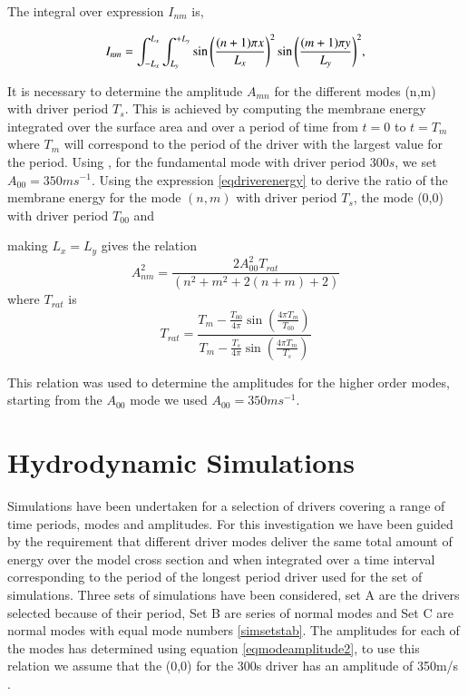 \documentclass[final,1p]{elsarticle}
\begin{document}
The integral over expression $I_{nm}$ is,

\begin{equation}\label{eqdriverenergyintegral}
I_{nm}=  \int_{-L_{x}}^{L_{x}} \int_{L_{y}}^{+L_{y}} \sin{\left(  {(n+1)\pi x}\over{L_x} \right)}^{2}   \sin{\left(  {(m+1)\pi y}\over{L_y} \right)}^{2}   ,
\end{equation}

It is necessary to determine the amplitude $A_{mn}$ for the different modes (n,m) with driver period $T_{s}$. This is achieved by computing the membrane energy integrated over the surface area and over a period of time from $t=0$ to $t=T_{m}$ where $T_m$ will correspond to the period of the driver with the largest value for the period.
Using   \cite{Leighton1960} , for the fundamental mode with driver period $300s$, we set $A_{00}=350ms^{-1}$. 
Using the expression \eqref{eqdriverenergy} to derive the ratio of the membrane energy for the mode $(n,m)$ with driver period $T_{s}$, the mode (0,0) with driver period $T_{00}$ and %

making $L_x=L_y$ gives the relation
\begin{equation}\label{eqmodeamplitude2}
A_{nm}^{2}=\frac{2A_{00}^{2}T_{rat}}{(n^2+m^2+2(n+m)+2)}
\end{equation}
where $T_{rat}$ is
\begin{equation}\label{eqtrat}
T_{rat}=
\frac{T_m-\frac{T_{00}}{4\pi}   \sin(\frac{4\pi T_m}{T_{00}})    }{T_m-\frac{T_{s}}{4\pi}   \sin(\frac{4\pi T_m}{T_{s}})  }
\end{equation}

This relation was used to determine the amplitudes for the higher order modes, starting from the $A_{00}$ mode we used  $A_{00}=350ms^{-1}$.



\section{Hydrodynamic Simulations}
Simulations have been undertaken for a selection of drivers covering a range of time periods, modes and amplitudes. For this investigation we have been guided by the requirement that  different driver modes deliver the same total amount of energy over the model cross section and when integrated over a time interval corresponding to the period of the longest period driver used for the set of simulations. Three sets of simulations have been considered, set A are the drivers selected because of their period, Set B are series of normal modes and Set C  are normal modes with equal mode numbers \ref{simsetstab}. The amplitudes for each of the modes has determined using  equation \eqref{eqmodeamplitude2}, to use this relation we assume that the (0,0) for the 300s driver has an amplitude of 350m/s \cite{Leighton1960}.
\end{document}
